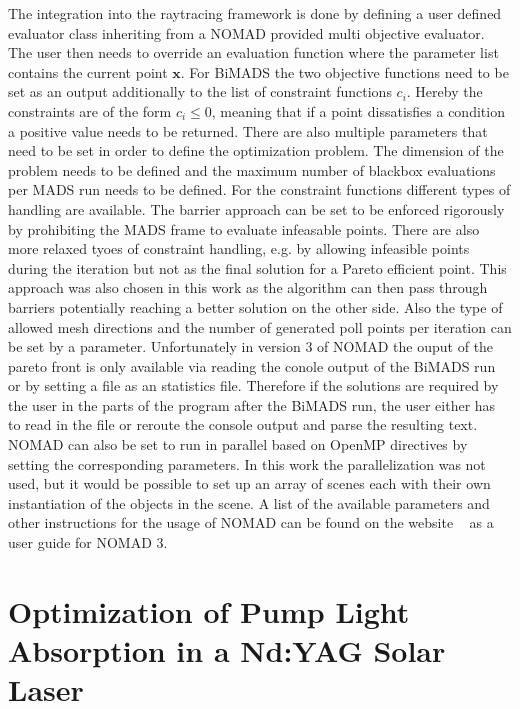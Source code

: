 \documentclass[a4paper,10pt]{article}
\renewcommand{\vec}[1]{\mathbf{#1}}
\begin{document}
    The integration into the raytracing framework is done by defining
    a user defined evaluator class inheriting from a NOMAD provided
    multi objective evaluator.
    The user then needs to override an evaluation function where the
    parameter list contains the current point $\vec{x}$.
    For BiMADS the two objective functions need to be set as an output
    additionally to the list of constraint functions $c_i$.
    Hereby the constraints are of the form $c_i \leq 0$, meaning that
    if a point dissatisfies a condition a positive value needs to be
    returned.       
    There are also multiple parameters that need to be set in order to
    define the optimization problem.
    The dimension of the problem needs to be defined and the maximum number
    of blackbox evaluations per MADS run needs to be defined.
    For the constraint functions different types of handling are available.
    The barrier approach can be set to be enforced rigorously by 
    prohibiting the MADS frame to evaluate infeasable points.
    There are also more relaxed tyoes of constraint handling, e.g. by allowing
    infeasible points during the iteration but not as the final solution
    for a Pareto efficient point.
    This approach was also chosen in this work as the algorithm can then pass
    through barriers potentially reaching a better solution on the other side.
    Also the type of allowed mesh directions and the number of 
    generated poll points per iteration can be set by a parameter.
    Unfortunately in version 3 of NOMAD the ouput of the pareto front
    is only available via reading the conole output of the BiMADS run
    or by setting a file as an statistics file.
    Therefore if the solutions are required by the user in the
    parts of the program after the BiMADS run, the user either has to
    read in the file or reroute the console output and parse the resulting
    text.
    NOMAD can also be set to run in parallel based on OpenMP directives by
    setting the corresponding parameters.
    In this work the parallelization was not used, but it would be possible
    to set up an array of scenes each with their own instantiation of
    the objects in the scene.
    A list of the available parameters and other instructions for 
    the usage of NOMAD can be found on the website ~\cite{nomad_website} as
    a user guide for NOMAD 3.
    

    \section{Optimization of Pump Light Absorption in a Nd:YAG Solar Laser} \label{sec:setup}
    
\end{document}
